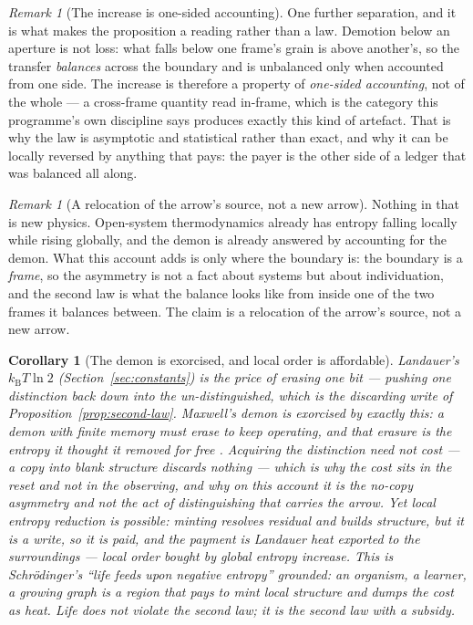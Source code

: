 \documentclass[11pt,a4paper]{article}
\newtheorem{corollary}[definition]{Corollary}
\theoremstyle{remark}\newtheorem{remark}[definition]{Remark}
\begin{document}
\begin{remark}[The increase is one-sided accounting]\label{rem:one-sided}
One further separation, and it is what makes the proposition a reading rather than a law. Demotion
below an aperture is not loss: what falls below one frame's grain is above another's, so the transfer
\emph{balances} across the boundary and is unbalanced only when accounted from one side. The
increase is therefore a property of \emph{one-sided accounting}, not of the whole --- a cross-frame
quantity read in-frame, which is the category this programme's own discipline says produces exactly
this kind of artefact. That is why the law is asymptotic and statistical rather than exact, and why it
can be locally reversed by anything that pays: the payer is the other side of a ledger that was
balanced all along.
\end{remark}

\begin{remark}[A relocation of the arrow's source, not a new arrow]\label{rem:arrow-relocation}
Nothing in that is new physics. Open-system thermodynamics already has entropy falling locally while
rising globally, and the demon is already answered by accounting for the demon. What this account adds
is only where the boundary is: the boundary is a \emph{frame}, so the asymmetry is not a fact about
systems but about individuation, and the second law is what the balance looks like from inside one of
the two frames it balances between. The claim is a relocation of the arrow's source, not a new
arrow.
\end{remark}

\begin{corollary}[The demon is exorcised, and local order is affordable]\label{cor:demon-life}
Landauer's $k_{\mathrm B}T\ln 2$ (Section~\ref{sec:constants}) is the price of
\emph{erasing} one bit --- pushing one distinction back down into the
un-distinguished, which is the discarding write of
Proposition~\ref{prop:second-law}. Maxwell's demon is exorcised by exactly this:
a demon with finite memory must erase to keep operating, and that erasure is the
entropy it thought it removed for free \citep{bennett1982}. Acquiring the
distinction need not cost --- a copy into blank structure discards nothing ---
which is why the cost sits in the reset and not in the observing, and why on this
account it is the \emph{no-copy} asymmetry and not the act of distinguishing that
carries the arrow. Yet local entropy reduction is
possible: minting resolves residual and builds structure, but it is a write, so
it is paid, and the payment is Landauer heat exported to the surroundings ---
local order bought by global entropy increase. This is Schr\"odinger's ``life
feeds upon negative entropy'' \citep{schrodinger1944} grounded: an organism, a learner, a
growing graph is a region that pays to mint local structure and dumps the cost as
heat. Life does not violate the second law; it is the second law with a subsidy.
\end{corollary}
\end{document}
